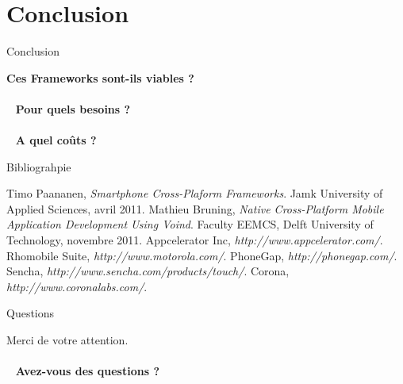 \documentclass{beamer}
\begin{document}
\section{Conclusion}
\begin{frame}{Conclusion}
\begin{center}
  \textbf{Ces Frameworks sont-ils viables ?}
  \\ ~ \\ ~
  \textbf{Pour quels besoins ?}
  \\ ~ \\ ~
  \textbf{A quel coûts ?}
\end{center}
\end{frame}

\begin{frame}{Bibliograhpie}
\begin{thebibliography}{9}
          Timo Paananen,
          \emph{Smartphone Cross-Plaform Frameworks}.
          Jamk University of Applied Sciences,
          avril 2011.
          Mathieu Bruning,
          \emph{Native Cross-Platform Mobile Application Development Using Voind}.
          Faculty EEMCS, Delft University of Technology,
          novembre 2011.
          Appcelerator Inc,
          \emph{http://www.appcelerator.com/}.
          Rhomobile Suite,
          \emph{http://www.motorola.com/}.
          PhoneGap,
          \emph{http://phonegap.com/}.
          Sencha,
          \emph{http://www.sencha.com/products/touch/}.
          Corona,
          \emph{http://www.coronalabs.com/}.
\end{thebibliography}
\end{frame}

\begin{frame}{Questions}
\begin{center}
  Merci de votre attention.
  \\ ~ \\ ~
  \textbf{Avez-vous des questions ?}
\end{center}
\end{frame}
\end{document}
